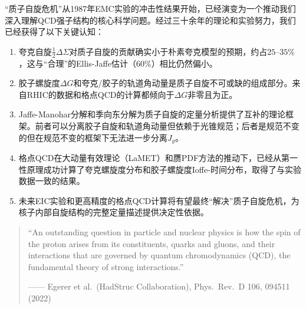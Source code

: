 \documentclass[12pt,a4paper]{ctexart}
\theoremstyle{definition}
\begin{document}
``质子自旋危机''从1987年EMC实验的冲击性结果开始，已经演变为一个推动我们深入理解QCD强子结构的核心科学问题。经过三十余年的理论和实验努力，我们已经获得了以下关键认知：

\begin{enumerate}
    \item 夸克自旋$\frac{1}{2}\Delta\Sigma$对质子自旋的贡献确实小于朴素夸克模型的预期，约占$25$--$35\%$，这与``合理''的Ellis-Jaffe估计（$60\%$）相比仍然偏小。

    \item 胶子螺旋度$\Delta G$和夸克/胶子的轨道角动量是质子自旋不可或缺的组成部分。来自RHIC的数据和格点QCD的计算都倾向于$\Delta G$非零且为正。

    \item Jaffe-Manohar分解和季向东分解为质子自旋的定量分析提供了互补的理论框架。前者可以分离胶子自旋和轨道角动量但依赖于光锥规范；后者是规范不变的但在规范不变的框架下无法进一步分离$J_g$。

    \item 格点QCD在大动量有效理论（LaMET）和赝PDF方法的推动下，已经从第一性原理成功计算了夸克螺旋度分布和胶子螺旋度Ioffe-时间分布，取得了与实验数据一致的结果。

    \item 未来EIC实验和更高精度的格点QCD计算将有望最终``解决''质子自旋危机，为核子内部自旋结构的完整定量描述提供决定性依据。
\end{enumerate}

\begin{quote}
\small
``An outstanding question in particle and nuclear physics is how the spin of the proton arises from its constituents, quarks and gluons, and their interactions that are governed by quantum chromodynamics (QCD), the fundamental theory of strong interactions.''
\begin{flushright}
—— Egerer et al.\ (HadStruc Collaboration), Phys.\ Rev.\ D 106, 094511 (2022) \cite{Egerer2022}
\end{flushright}
\end{quote}

\end{document}
